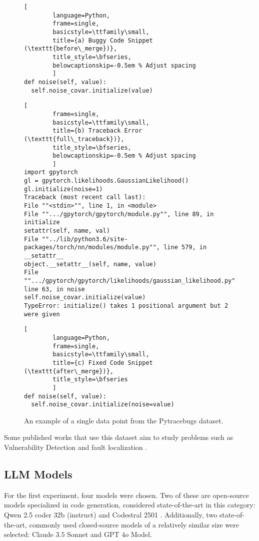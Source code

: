 \begin{figure}[h!]
    \centering
    \caption{An example of a single data point from the Pytracebugs dataset.}
    \label{fig:dataset-example}

    \begin{lstlisting}[
        language=Python,
        frame=single,
        basicstyle=\ttfamily\small,
        title={a) Buggy Code Snippet (\texttt{before\_merge})},
        title_style=\bfseries,
        belowcaptionskip=-0.5em % Adjust spacing
        ]
def noise(self, value):
  self.noise_covar.initialize(value)
    \end{lstlisting}

    \begin{lstlisting}[
        frame=single,
        basicstyle=\ttfamily\small,
        title={b) Traceback Error (\texttt{full\_traceback})},
        title_style=\bfseries,
        belowcaptionskip=-0.5em % Adjust spacing
        ]
import gpytorch
gl = gpytorch.likelihoods.GaussianLikelihood()
gl.initialize(noise=1)
Traceback (most recent call last):
File ""<stdin>"", line 1, in <module>
File "".../gpytorch/gpytorch/module.py"", line 89, in initialize
setattr(self, name, val)
File ""../lib/python3.6/site-packages/torch/nn/modules/module.py"", line 579, in __setattr__
object.__setattr__(self, name, value)
File "".../gpytorch/gpytorch/likelihoods/gaussian_likelihood.py"", line 63, in noise
self.noise_covar.initialize(value)
TypeError: initialize() takes 1 positional argument but 2 were given
    \end{lstlisting}

    \begin{lstlisting}[
        language=Python,
        frame=single,
        basicstyle=\ttfamily\small,
        title={c) Fixed Code Snippet (\texttt{after\_merge})},
        title_style=\bfseries
        ]
def noise(self, value):
  self.noise_covar.initialize(noise=value)
    \end{lstlisting}
\end{figure}


Some published works that use this dataset aim to study problems such as Vulnerability Detection \cite{zhao2024coding} and fault localization \cite{kulkarni2024graph}.

\subsection{LLM Models}
For the first experiment, four models were chosen. Two of these are open-source models specialized in code generation, considered state-of-the-art in this category: Qwen 2.5 coder 32b (instruct) \cite{hui2024qwen25codertechnicalreport} and Codestral 2501 \cite{Codestral_202501}. Additionally, two state-of-the-art, commonly used closed-source models of a relatively similar size were selected: Claude $3.5$ Sonnet and GPT $4o$ Model.

